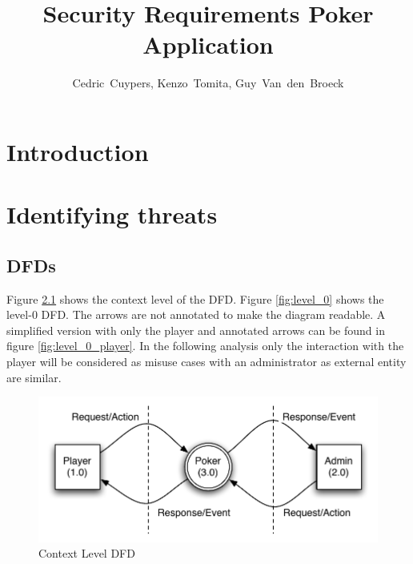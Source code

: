\documentclass[a4paper,11pt]{report}
\author{Cedric~Cuypers, Kenzo~Tomita, Guy~Van~den~Broeck}
\title{Security Requirements Poker Application}
\begin{document}
 
\maketitle 
\tableofcontents 

\chapter{Introduction}
\chapter{Identifying threats}
\section{DFDs}
Figure \ref{fig:context} shows the context level of the DFD. Figure \ref{fig:level_0} shows the level-0 DFD. The arrows are not annotated to make the diagram readable. A simplified version with only the player and annotated arrows can be found in figure \ref{fig:level_0_player}. In the following analysis only the interaction with the player will be considered as misuse cases with an administrator as external entity are similar.
\begin{figure}
  \begin{center}
    \includegraphics{context_diagram}
  \end{center}
  \caption{Context Level DFD}\label{fig:context}
\end{figure}
\end{document}
